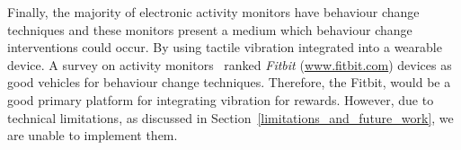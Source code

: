 Finally, the majority of electronic activity monitors have behaviour change techniques and these monitors present a medium which behaviour change interventions could occur. By using tactile vibration integrated into a wearable device. A survey on activity monitors~\cite{article_wearable_good} ranked \textit{Fitbit} (\url{www.fitbit.com}) devices as good vehicles for behaviour change techniques. Therefore, the Fitbit, would be a good primary platform for integrating vibration for rewards. However, due to technical limitations, as discussed in Section~\ref{limitations_and_future_work}, we are unable to implement them.

